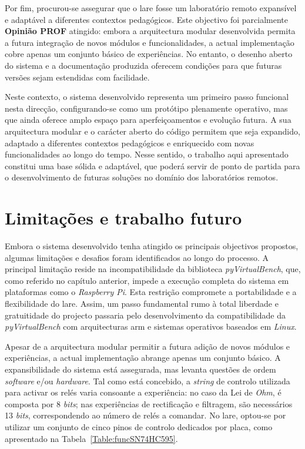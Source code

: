 Por fim, procurou-se assegurar que o \acrshort{lare} fosse um \acrshort{laboratório remoto} expansível e adaptável a diferentes contextos pedagógicos. Este objectivo foi parcialmente \textbf{Opinião PROF} atingido: embora a arquitectura modular desenvolvida permita a futura integração de novos módulos e funcionalidades, a actual implementação cobre apenas um conjunto básico de experiências. No entanto, o desenho aberto do sistema e a documentação produzida oferecem condições para que futuras versões sejam estendidas com facilidade.

Neste contexto, o sistema desenvolvido representa um primeiro passo funcional nesta direcção, configurando-se como um protótipo plenamente operativo, mas que ainda oferece amplo espaço para aperfeiçoamentos e evolução futura. A sua arquitectura modular e o carácter aberto do código permitem que seja expandido, adaptado a diferentes contextos pedagógicos e enriquecido com novas funcionalidades ao longo do tempo. Nesse sentido, o trabalho aqui apresentado constitui uma base sólida e adaptável, que poderá servir de ponto de partida para o desenvolvimento de futuras soluções no domínio dos laboratórios remotos.

\section{Limitações e trabalho futuro}
\label{limitacoes}
Embora o sistema desenvolvido tenha atingido os principais objectivos propostos, algumas limitações e desafios foram identificados ao longo do processo. A principal limitação reside na incompatibilidade da biblioteca \textit{pyVirtualBench}, que, como referido no capítulo anterior, impede a execução completa do sistema em plataformas como o \textit{Raspberry Pi}. Esta restrição compromete a portabilidade e a flexibilidade do \acrshort{lare}. Assim, um passo fundamental rumo à total liberdade e gratuitidade do projecto passaria pelo desenvolvimento da compatibilidade da \textit{pyVirtualBench} com arquitecturas \acrshort{arm} e sistemas operativos baseados em \textit{Linux}.

Apesar de a arquitectura modular permitir a futura adição de novos módulos e experiências, a actual implementação abrange apenas um conjunto básico. A expansibilidade do sistema está assegurada, mas levanta questões de ordem \textit{software} e/ou \textit{hardware}. Tal como está concebido, a \textit{string} de controlo utilizada para activar os relés varia consoante a experiência: no caso da Lei de \textit{Ohm}, é composta por 8 \textit{bits}; nas experiências de rectificação e filtragem, são necessários 13 \textit{bits}, correspondendo ao número de relés a comandar. No \acrshort{lare}, optou-se por utilizar um conjunto de cinco pinos de controlo dedicados por placa, como apresentado na Tabela~\ref{Table:funcSN74HC595}.

